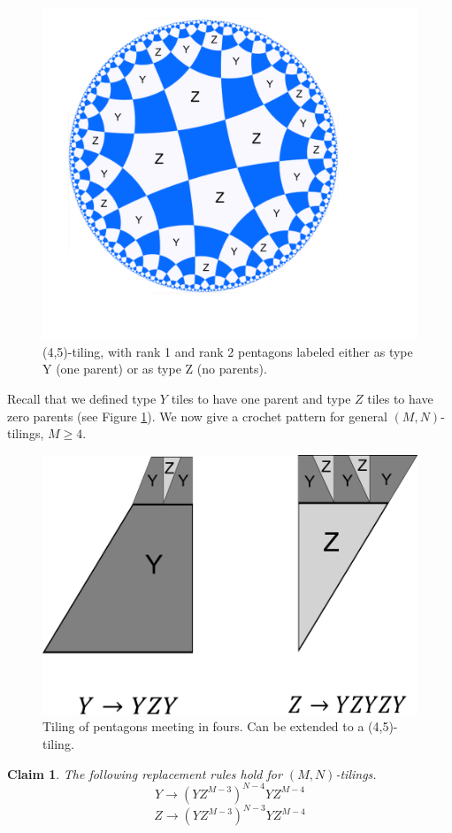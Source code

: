 \documentclass[11pt, oneside]{article}   	%
\newtheorem{claim}{Claim}
\begin{document}
\begin{figure}[h]
\centering
\includegraphics[width=.60\textwidth]{4-5labeled.pdf}
\caption{(4,5)-tiling, with rank 1 and rank 2 pentagons labeled either as type Y (one parent) or as type Z (no parents).}
\label{fig:4-5labeled}
\end{figure}

Recall that we defined type $Y$ tiles to have one parent and type $Z$ tiles to have zero parents (see Figure \ref{fig:4-5labeled}). We now give a crochet pattern for general $(M,N)$-tilings, $M\geq 4$.

\begin{figure}[b]
\centering
\includegraphics[width=.5\textwidth]{4-5crochet1.pdf}
\caption{Tiling of pentagons meeting in fours. Can be extended to a (4,5)-tiling.}
\label{fig:4-5crochet}
\end{figure}

\begin{claim} The following replacement rules hold for $(M,N)$-tilings.
\begin{equation} \label{eq:crochety} Y \to (YZ^{M-3})^{N-4}YZ^{M-4} \end{equation}
\begin{equation} \label{eq:crochetz} Z \to (YZ^{M-3})^{N-3}YZ^{M-4} \end{equation}
\end{claim}
\end{document}
